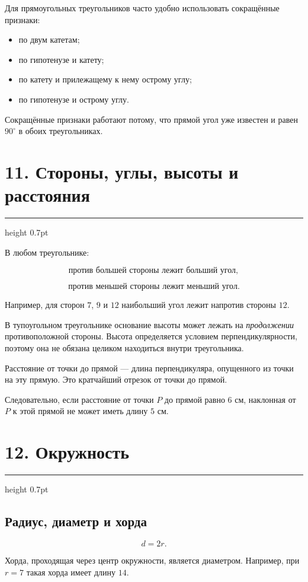 \documentclass[a4paper,12pt]{article}
\newcommand{\sectionline}{%
    \vspace{-0.15em}
    {\color{accent}\hrule height 0.7pt}
    \vspace{0.55em}
}
\begin{document}
Для прямоугольных треугольников часто удобно использовать сокращённые
признаки:

\begin{itemize}
    \item по двум катетам;
    \item по гипотенузе и катету;
    \item по катету и прилежащему к нему острому углу;
    \item по гипотенузе и острому углу.
\end{itemize}

Сокращённые признаки работают потому, что прямой угол уже известен и равен
$90^\circ$ в обоих треугольниках.

\section*{\color{darkaccent}11. Стороны, углы, высоты и расстояния}
\sectionline

В любом треугольнике:

\[
\text{против большей стороны лежит больший угол},
\]

\[
\text{против меньшей стороны лежит меньший угол}.
\]

Например, для сторон $7$, $9$ и $12$ наибольший угол лежит напротив стороны
$12$.

В тупоугольном треугольнике основание высоты может лежать на
\emph{продолжении} противоположной стороны. Высота определяется условием
перпендикулярности, поэтому она не обязана целиком находиться внутри
треугольника.

Расстояние от точки до прямой --- длина перпендикуляра, опущенного из точки на
эту прямую. Это кратчайший отрезок от точки до прямой.

Следовательно, если расстояние от точки $P$ до прямой равно $6$ см, наклонная
от $P$ к этой прямой не может иметь длину $5$ см.

\section*{\color{darkaccent}12. Окружность}
\sectionline

\subsection*{Радиус, диаметр и хорда}

\[
d=2r.
\]

Хорда, проходящая через центр окружности, является диаметром. Например, при
$r=7$ такая хорда имеет длину $14$.
\end{document}
